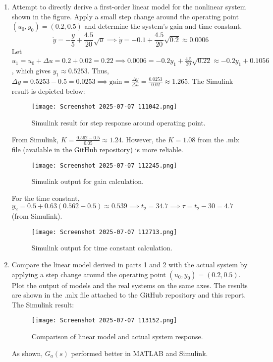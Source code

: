 \documentclass{article}
\begin{document}
\begin{enumerate}
  \item Attempt to directly derive a first-order linear model for the nonlinear system shown in the figure. Apply a small step change around the operating point $(u_0,y_0)=(0.2,0.5)$ and determine the system's gain and time constant.
  \begin{equation*}
    \dot{y} = -\frac{y}{5} + \frac{4.5}{20}\sqrt{u} \implies \dot{y} = -0.1 + \frac{4.5}{20}\sqrt{0.2} \approx 0.0006
  \end{equation*}
  Let $u_1 = u_0 + \Delta u = 0.2 + 0.02 = 0.22 \implies 0.0006 = -0.2y_1 + \frac{4.5}{20}\sqrt{0.22} \approx -0.2y_1 + 0.1056$, which gives $y_1 \approx 0.5253$. Thus, $\Delta y = 0.5253 - 0.5 = 0.0253 \implies \text{gain} = \frac{\Delta y}{\Delta u} = \frac{0.0253}{0.02} \approx 1.265$. The Simulink result is depicted below:
  \begin{figure}[h!]
    \centering
    \texttt{[image: Screenshot 2025-07-07 111042.png]}
    \caption{Simulink result for step response around operating point.}
    \label{fig:step_response}
  \end{figure}
  From Simulink, $K = \frac{0.562-0.5}{0.05} \approx 1.24$. However, the $K=1.08$ from the .mlx file (available in the GitHub repository) is more reliable.
  \begin{figure}[h!]
    \centering
    \texttt{[image: Screenshot 2025-07-07 112245.png]}
    \caption{Simulink output for gain calculation.}
    \label{fig:gain_calc}
  \end{figure}
  For the time constant, $y_2 = 0.5 + 0.63 (0.562 - 0.5) \approx 0.539 \implies t_2 = 34.7 \implies \tau = t_2 - 30 = 4.7$ (from Simulink).
  \begin{figure}[h!]
    \centering
    \texttt{[image: Screenshot 2025-07-07 112713.png]}
    \caption{Simulink output for time constant calculation.}
    \label{fig:time_constant}
  \end{figure}

  \item Compare the linear model derived in parts 1 and 2 with the actual system by applying a step change around the operating point $(u_0,y_0)=(0.2,0.5)$. Plot the output of models and the real systems on the same axes.
  The results are shown in the .mlx file attached to the GitHub repository and this report. The Simulink result:
  \begin{figure}[h!]
    \centering
    \texttt{[image: Screenshot 2025-07-07 113152.png]}
    \caption{Comparison of linear model and actual system response.}
    \label{fig:model_comparison}
  \end{figure}
  As shown, $G_a(s)$ performed better in MATLAB and Simulink.


\end{enumerate}
\end{document}
